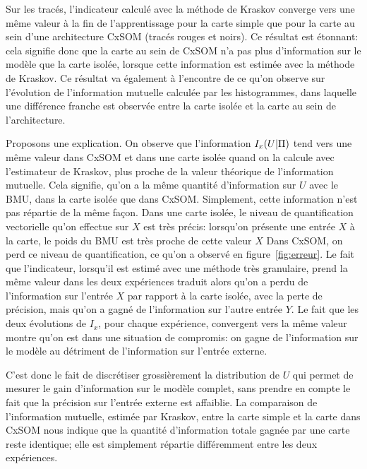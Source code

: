Sur les tracés, l'indicateur calculé avec la méthode de Kraskov converge vers une même valeur à la fin de l'apprentissage pour la carte simple que pour la carte au sein d'une architecture CxSOM (tracés rouges et noirs). Ce résultat est étonnant: cela signifie donc que la carte au sein de CxSOM n'a pas plus d'information sur le modèle que la carte isolée, lorsque cette information est estimée avec la méthode de Kraskov. Ce résultat va également à l'encontre de ce qu'on observe sur l'évolution de l'information mutuelle calculée par les histogrammes, dans laquelle une différence franche est observée entre la carte isolée et la carte au sein de l'architecture.

Proposons une explication.
On observe que l'information $I_x(U|\Pi)$ tend vers une même valeur dans CxSOM et dans une carte isolée quand on la calcule avec l'estimateur de Kraskov, plus proche de la valeur théorique de l'information mutuelle. Cela signifie, qu'on a la même quantité d'information sur $U$ avec le BMU, dans la carte isolée que dans CxSOM. Simplement, cette information n'est pas répartie de la même façon. 
Dans une carte isolée, le niveau de quantification vectorielle qu'on effectue sur $X$ est très précis: lorsqu'on présente une entrée $X$ à la carte, le poids du BMU est très proche de cette valeur $X$ Dans CxSOM, on perd ce niveau de quantification, ce qu'on a observé en figure~\ref{fig:erreur}. Le fait que l'indicateur, lorsqu'il est estimé avec une méthode très granulaire, prend la même valeur dans les deux expériences traduit alors qu'on a perdu de l'information sur l'entrée $X$ par rapport à la carte isolée, avec la perte de précision, mais qu'on a gagné de l'information sur l'autre entrée $Y$. Le fait que les deux évolutions de $I_x$, pour chaque expérience, convergent vers la même valeur montre qu'on est dans une situation de compromis: on gagne de l'information sur le modèle au détriment de l'information sur l'entrée externe.

C'est donc le fait de discrétiser grossièrement la distribution de $U$ qui permet de mesurer le gain d'information sur le modèle complet, sans prendre en compte le fait que la précision sur l'entrée externe est affaiblie. 
La comparaison de l'information mutuelle, estimée par Kraskov, entre la carte simple et la carte dans CxSOM nous indique que la quantité d'information totale gagnée par une carte reste identique; elle est simplement répartie différemment entre les deux expériences.

